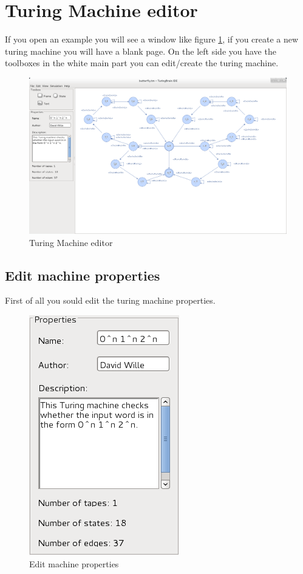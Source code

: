 \documentclass[%
  a4paper,%
  11pt,%
  blue,%
  hyperref	%
  ]{tubsartcl}
\begin{document}
\section{Turing Machine editor}
If you open an example you will see a window like figure \ref{pic:turing_editor}, if you create a new turing machine you will have a blank page. On the left side you have the toolboxes in the white main part you can edit/create the turing machine.
\begin{figure}[!htb]
\begin{center}
\includegraphics[scale=0.3]{graphics_gui/turing_editor.png}
\end{center}
\caption{Turing Machine editor}
\label{pic:turing_editor}
\end{figure}

\newpage

\subsection{Edit machine properties}
\label{sec:edit-mach-prop}
First of all you sould edit the turing machine properties.
\begin{figure}[!htb]
\begin{center}
\includegraphics[scale=0.5]{graphics_gui/machine_properties.png}
\end{center}
\caption{Edit machine properties}
\label{pic:machine_properties}
\end{figure}
\end{document}
